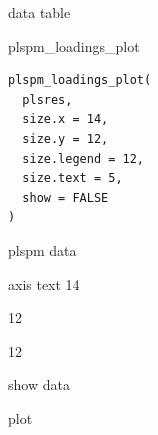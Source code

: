 \documentclass[a4paper]{book}
\begin{document}
%
\begin{Value}
data table
\end{Value}
%
\begin{Examples}
\end{Examples}
%
\begin{Description}
plspm\_loadings\_plot
\end{Description}
%
\begin{Usage}
\begin{verbatim}
plspm_loadings_plot(
  plsres,
  size.x = 14,
  size.y = 12,
  size.legend = 12,
  size.text = 5,
  show = FALSE
)
\end{verbatim}
\end{Usage}
%
\begin{Arguments}
\begin{ldescription}
\item[\code{plsres}] plspm data

\item[\code{size.x}] axis text 14

\item[\code{size.y}] 12

\item[\code{size.legend}] 12

\item[\code{size.text}] show data
\end{ldescription}
\end{Arguments}
%
\begin{Value}
plot
\end{Value}
%
\end{document}
